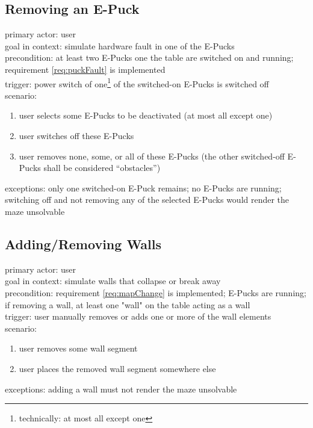 \documentclass[a4paper,parskip,headheight=38pt]{scrartcl} %
\begin{document}
\subsection{Removing an E-Puck}
primary actor: user \\
goal in context: simulate hardware fault in one of the E-Pucks \\
precondition: at least two E-Pucks one the table are switched on and running; requirement \ref{req:puckFault} is implemented \\
trigger: power switch of one\footnote{technically: at most all except one} of the switched-on E-Pucks is switched off \\
scenario:
\begin{enumerate}[label={\arabic*.}]
	\item user selects some E-Pucks to be deactivated (at most all except one)
	\item user switches off these E-Pucks
	\item user removes none, some, or all of these E-Pucks (the other switched-off E-Pucks shall be considered \enquote{obstacles})
\end{enumerate}
exceptions: only one switched-on E-Puck remains; no E-Pucks are running; switching off and not removing any of the selected E-Pucks would render the maze unsolvable \\

\subsection{Adding/Removing Walls}
primary actor: user \\
goal in context: simulate walls that collapse or break away \\
precondition: requirement \ref{req:mapChange} is implemented; E-Pucks are running; if removing a wall, at least one "wall" on the table acting as a wall \\
trigger: user manually removes or adds one or more of the wall elements \\
scenario:
\begin{enumerate}[label={\arabic*.}]
	\item user removes some wall segment
	\item user places the removed wall segment somewhere else
\end{enumerate}
exceptions: adding a wall must not render the maze unsolvable \\
\end{document}
